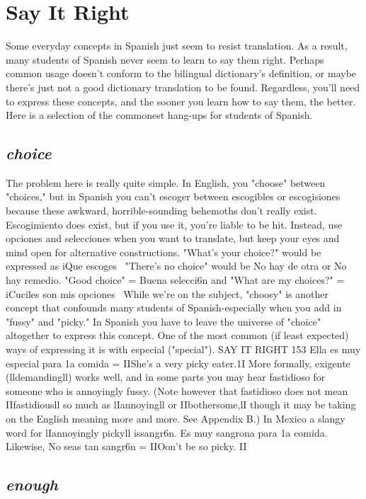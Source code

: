 \documentclass[14pt,a4paper,oneside]{memoir}
\begin{document}
\chapter{Say It Right}

Some everyday concepts in Spanish just seem to resist translation. As a result, many students of Spanish never seem to learn to say
them right. Perhaps common usage doesn't conform to the bilingual
dictionary's definition, or maybe there's just not a good dictionary
translation to be found. Regardless, you'll need to express these concepts, and the sooner you learn how to say them, the better. Here is a
selection of the commonest hang-ups for students of Spanish.

\section{\emph{choice}}

The problem here is really quite simple. In English, you
"choose" between "choices," but in Spanish you can't escoger between
escogibles or escogisiones because these awkward, horrible-sounding
behemoths don't really exist. Escogimiento does exist, but if you use
it, you're liable to be hit. Instead, use opciones and selecciones when
you want to translate, but keep your eyes and mind open for alternative constructions. "What's your choice?" would be expressed as iQue
escoges~ "There's no choice" would be No hay de otra or No hay remedio. "Good choice" = Buena selecci6n and "What are my choices?"
= iCuciles son mis opciones~
While we're on the subject, "choosy" is another concept that
confounds many students of Spanish-especially when you add in
"fussy" and "picky." In Spanish you have to leave the universe of
"choice" altogether to express this concept. One of the most common
(if least expected) ways of expressing it is with especial ("special").
SAY IT RIGHT 153
Ella es muy especial para 1a comida = IIShe's a very picky eater.1I
More formally, exigente (lldemandingll) works well, and in some parts
you may hear fastidioso for someone who is annoyingly fussy. (Note
however that fastidioso does not mean IIfastidiousll so much as lIannoyingll or IIbothersome,lI though it may be taking on the English
meaning more and more. See Appendix B.) In Mexico a slangy word
for lIannoyingly pickyll issangr6n. Es muy sangrona para 1a comida.
Likewise, No seas tan sangr6n = IIOon't be so picky. II

\section{\emph{enough}}
\end{document}
